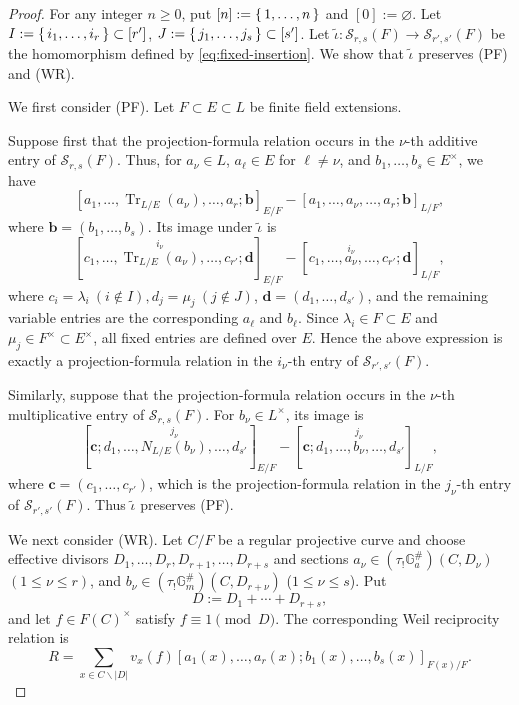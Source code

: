 \documentclass[a4paper,12pt,reqno]{amsart}
\numberwithin{equation}{section}
\theoremstyle{definition}
\DeclareMathOperator{\Tr}{Tr}
\newcommand{\GaSharp}{\mathbb{G}_{a}^{\#}}
\newcommand{\GmSharp}{\mathbb G_m^{\#}}
\newcommand{\vb}{\mathbf{b}}
\newcommand{\vc}{\mathbf{c}}
\newcommand{\vd}{\mathbf{d}}
\begin{document}
\begin{proof}
For any integer $n\ge 0$, put $[n]:=\set{1,\ldots,n}$ and $[0]:=\varnothing$.
Let
 $I:=\set{i_1,\ldots,i_r}\subset[r']$,  
 $J:=\set{j_1,\ldots,j_s}\subset[s']$.
Let $\widetilde\iota:
 \mathcal S_{r,s}(F)\to\mathcal S_{r',s'}(F)$ 
be the homomorphism defined by \eqref{eq:fixed-insertion}.
We show that $\widetilde\iota$ preserves
\textnormal{(PF)} and \textnormal{(WR)}.

We first consider \textnormal{(PF)}.
Let $F\subset E\subset L$ be finite field extensions.

Suppose first that the projection-formula relation occurs in the
$\nu$-th additive entry of $\mathcal S_{r,s}(F)$.
Thus, for $a_\nu\in L$, $a_\ell\in E$ for $\ell\neq\nu$, and
$b_1,\ldots,b_s\in E^\times$, we have
\[
 [a_1,\ldots,\Tr_{L/E}(a_\nu),\ldots,a_r;
 \vb]_{E/F}
 -
 [a_1,\ldots,a_\nu,\ldots,a_r;
 \vb]_{L/F}, 
\]
where $\vb = (b_1,\ldots,b_s)$. 
Its image under $\widetilde\iota$ is
\[[c_1,\ldots,
   \overset{i_\nu}{\Tr_{L/E}(a_\nu)},
   \ldots,c_{r'};\vd]_{E/F}-
 [c_1,\ldots,
   \overset{i_\nu}{a_\nu},
   \ldots,c_{r'};\vd]_{L/F},
\]
where 
 $c_i=\lambda_i\ (i\notin I),
 d_j=\mu_j\ (j\notin J)$, $\vd = (d_1,\ldots,d_{s'})$,
and the remaining variable entries are the corresponding
$a_\ell$ and $b_\ell$.
Since $\lambda_i\in F\subset E$ and
$\mu_j\in F^\times\subset E^\times$, all fixed entries are defined
over $E$.  Hence the above expression is exactly a projection-formula
relation in the $i_\nu$-th entry of
$\mathcal S_{r',s'}(F)$.

Similarly, suppose that the projection-formula relation occurs in the
$\nu$-th multiplicative entry of $\mathcal S_{r,s}(F)$.  For $b_\nu\in L^\times$, its image is
\[
 [\vc;
 d_1,\ldots,
 \overset{j_\nu}{N_{L/E}(b_\nu)},
 \ldots,d_{s'}]_{E/F} -
 [\vc;
 d_1,\ldots,
 \overset{j_\nu}{b_\nu},
 \ldots,d_{s'}]_{L/F},
\]
where $\vc = (c_1,\ldots,c_{r'})$, 
which is the projection-formula relation in the $j_\nu$-th
 entry of $\mathcal S_{r',s'}(F)$.
Thus $\widetilde\iota$ preserves \textnormal{(PF)}.

We next consider \textnormal{(WR)}.
Let $C/F$ be a regular projective curve and choose effective divisors
$ D_1,\ldots,D_r,D_{r+1},\ldots,D_{r+s}$
and sections $a_\nu\in(\tau_!\GaSharp)(C,D_\nu)$ 
 $(1\leq\nu\leq r)$,
and
 $b_\nu\in(\tau_!\GmSharp)(C,D_{r+\nu})$ ($1\leq\nu\leq s$).
Put
\[
 D:=D_1+\cdots+D_{r+s},
\]
and let $f\in F(C)^\times$ satisfy $f\equiv1\pmod D$.
The corresponding Weil reciprocity relation is
\[
 R=
 \sum_{x\in C\smallsetminus|D|}
 v_x(f)
 [a_1(x),\ldots,a_r(x);
 b_1(x),\ldots,b_s(x)]_{F(x)/F}.
\]


\end{proof}
\end{document}
